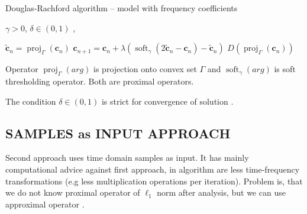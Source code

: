 \documentclass[conference]{IEEEtran}
\begin{document}
\begin{algorithm}
	\caption{Douglas-Rachford algorithm -- model with frequency coefficients}
	\begin{algorithmic}[1]\label{alg:DRA_c}
		\renewcommand{\algorithmicrequire}{\textbf{Input:}}
		\renewcommand{\algorithmicensure}{\textbf{Output:}}
		\REQUIRE  $ \gamma > 0 $, $ \delta  \in (0,1)$ ,
		
		\STATE $\mathbf{\widetilde{c}}_n=\operatorname{proj}_{\Gamma}(\mathbf{c}_n) $ 
		\STATE $ \mathbf{c}_{n+1} = \mathbf{c}_n + \lambda \left( \operatorname{soft}_{\gamma}\left(2\mathbf{\widetilde{c}}_n-\mathbf{c}_n \right)-\mathbf{\widetilde{c}}_n\right)$
		\ENDFOR
		\RETURN $D(\operatorname{proj}_{\Gamma}(\mathbf{c}_n))$ 
	\end{algorithmic} 
\end{algorithm}
Operator $ \operatorname{proj}_{\Gamma}(arg)$ is projection onto convex set $ \Gamma $ and $\operatorname{soft}_{\gamma}(arg)$ is soft thresholding operator.
Both are proximal operators.

The condition   $ \delta  \in (0,1)$ is strict for convergence of solution \cite{Combettes2010}.


\subsection{SAMPLES as INPUT APPROACH}\label{subsec:timecoef}

Second approach uses time domain samples as input.
It has mainly computational advice against first approach, in algorithm are less time-frequency transformations (e.g less multiplication operations per iteration).
Problem is, 
that we do not know proximal operator of $ \ell_1 $ norm after analysis, but we can use approximal operator \cite{Mokry2021}.
\end{document}
